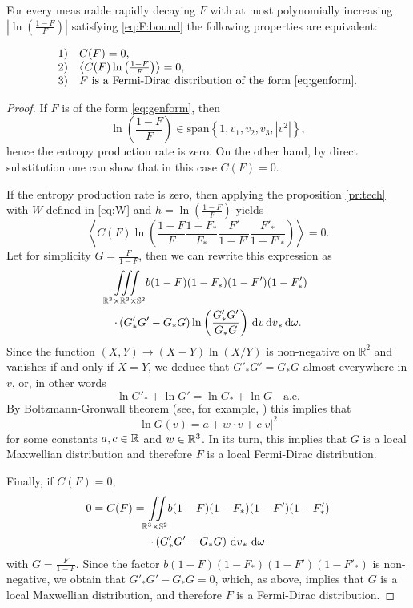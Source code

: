 \begin{proposition}[H-theorem]
	For every measurable rapidly decaying  $F$ with at most polynomially increasing $\left|\ln \left(\frac{1-F}{F}\right)\right|$ satisfying \eqref{eq:F:bound} the following properties 
are equivalent:
 
\begin{equation}\label{eq:Hthm}\begin{array}{rl}
1)& C(F)=0,\\
2)&  \left\langle C(F)\ln \left(\frac{1-F}{F}\right)\right\rangle=0,\\
3)& F \mbox{ is a Fermi-Dirac distribution of the form }\eqref{eq:genform}.
\end{array}\end{equation}
\end{proposition}

\begin{proof}
	
If $F $ is of the form \eqref{eq:genform}, then \[\ln\left(\frac{1-F}{F}\right) \in \mathrm{span}\left\{1,v_1,v_2,v_3,|v^2|\right\}, \]
hence the entropy production rate is zero. On the other hand, by direct substitution one can show that in this case $C(F)=0$. 

If the entropy production rate is zero, then applying the proposition \ref{pr:tech} with $W$ defined in \eqref{eq:W} and $h=\ln\left(\frac{1-F}{F}\right)$
yields 
\[\left\langle C(F)\ln \left(\frac{1-F }{F }\frac{1-F_\ast }{F_\ast }\frac{F'}{1-F'}\frac{F'_\ast}{1-F'_\ast}\right)\right\rangle=0.\]
Let for simplicity $G=\frac{F}{1-F}$, then we can rewrite this expression as 
\begin{multline*} 
 {\iiint\limits_{\mathbb R^3\times\mathbb R^3\times\mathbb S^2}} b(1-F)(1-F_\ast)(1-F')(1-F'_\ast)\\\cdot \left(G'_\ast G' -G_\ast G\right)\ln\left(\frac{G'_\ast G'}{G_\ast G}\right){\,\mathrm{d} v} {\,\mathrm{d} v}_\ast  {\,\mathrm{d} \omega}.\end{multline*}
 Since the function $(X,Y)\to (X-Y)\ln(X/Y)$ is non-negative on $\mathbb R^2$ and vanishes if and only if $X=Y$, we deduce that $G'_\ast G' =G_\ast G $ almost everywhere in $v$, or, in other words
 \[\ln G'_\ast+ \ln G' =\ln G_\ast +\ln G \quad \text{a.e.}\]
 By Boltzmann-Gronwall theorem (see, for example, \cite{cercignani1988boltzmann,Glassey1987Cauchy,Truesdell1980Fundamentalsa}) this implies that
 \[\ln G(v) = a+w\cdot v+c|v|^2\]
 for some constants $a,c\in{\mathbb {R}}$ and $w\in {\mathbb {R}^3}$. In its turn, this implies that $G$ is a local Maxwellian distribution and therefore $F$ is a local Fermi-Dirac distribution.

Finally, if $C(F)=0$, 
\begin{multline}\label{eq:C:toMax}
0=C(F) = {\iint\limits_{\mathbb R^3\times\mathbb S^2}} b(1-F)(1-F_\ast)(1-F')(1-F'_\ast)\\\cdot \left( G'_\ast G' - G_\ast G\right) {\,\mathrm{d} v}_\ast\,{\,\mathrm{d} \omega}
\end{multline}
with $G=\frac{F }{1-F}$. Since the factor $b(1-F)(1-F_\ast)(1-F')(1-F'_\ast)$  is non-negative, we obtain that $G'_\ast G' - G_\ast G =0$, which, as above, implies that $G$ is a local Maxwellian distribution, and therefore $F$ is a Fermi-Dirac distribution.
\end{proof}


